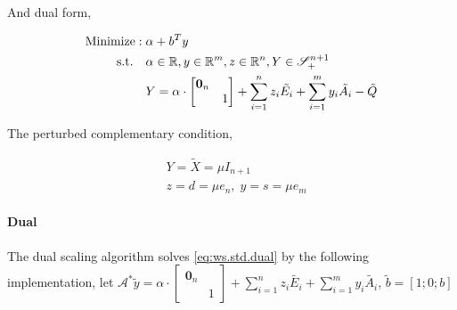 \documentclass[../main]{subfiles}
\begin{document}
And dual form,

\begin{equation} \label{eq:ws.std.dual}
    \begin{aligned}
        \mathrm{Minimize:\;}           & \alpha + b^Ty                                                                           \\
        \mathrm{s.t.} \quad & \alpha \in \mathbb{R}, y \in \mathbb{R}^m, z\in \mathbb{R}^n, Y  \in \mathscr S^{n+1}_+ \\
                            & Y =\alpha \cdot \begin{bmatrix}  \bm 0_n &  \\  & 1  \end{bmatrix}
        + \sum_{i=1}^{n} z_{i} \tilde{E_i}
        + \sum_{i=1}^{m} y_{i} \tilde{A_i}
        - \tilde{Q}
    \end{aligned}
\end{equation}

The perturbed complementary condition,

\begin{equation} \label{eq:ws.std.lc}
    \begin{aligned}
         & Y = \tilde X = \mu I_{n+1}           \\
         & z = d =  \mu e_n, \; y = s = \mu e_m
    \end{aligned}
\end{equation}



\paragraph{Dual}
The dual scaling algorithm \cite{benson_solving_2000} solves \eqref{eq:ws.std.dual} by the following implementation,
let \(\mathcal{A}^{*} \tilde y = \alpha \cdot \begin{bmatrix}  \bm 0_n &  \\  & 1  \end{bmatrix}
+ \sum_{i=1}^{n} z_{i} \tilde{E_i}
+ \sum_{i=1}^{m} y_{i} \tilde{A_i}\), \(\tilde b = [1; 0; b]\)
\end{document}
